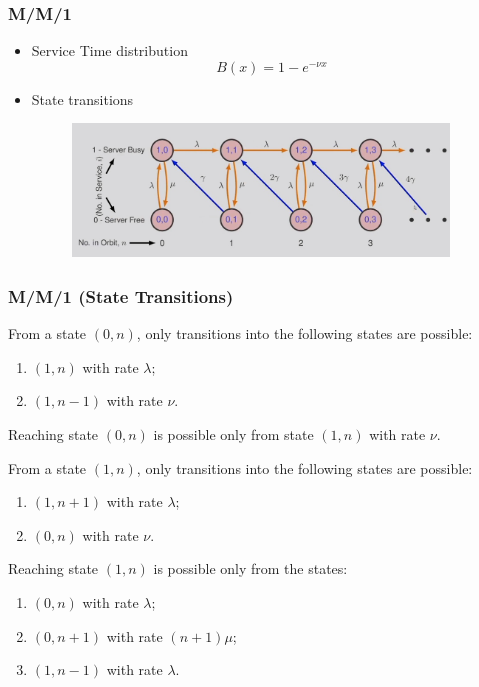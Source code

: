 \documentclass{beamer}
\def \mp {\pause}
\def \mp {}
\newcommand{\ft}[1]{\frametitle{#1}}
\begin{document}
\begin{frame}
\ft{M/M/1} 
\begin{itemize}\setlength\itemsep{.4em}
 \mp \item Service Time distribution \[B(x)=1-e^{-\nu x}\]
 \mp \item State transitions
 \begin{figure}
\includegraphics[width=10cm]{states}
\centering
\end{figure}
\end{itemize}
\end{frame}

\begin{frame}
\ft{M/M/1 (State Transitions)} 
    From a state $(0, n)$, only transitions into the following states are possible:
\begin{enumerate}

\item $(1, n)$ with rate $\lambda$;
\item $(1, n - 1)$ with rate $\nu$.
\end{enumerate}

Reaching state $(0, n)$ is possible only from state $(1, n)$ with rate $\nu$.

From a state $(1, n)$, only transitions into the following states are possible:
\begin{enumerate}
\item $(1, n + 1)$ with rate $\lambda$;
\item $(0, n)$ with rate $\nu$.
\end{enumerate}

Reaching state $(1,n)$ is possible only from the states: \\

  \begin{enumerate}
    \item $(0,n)$ with rate $\lambda$; 
    \item $(0,n+1)$ with rate $(n+1)\mu$; 
    \item $(1, n-1)$ with rate $\lambda$.
  \end{enumerate}
\end{frame}
\end{document}
